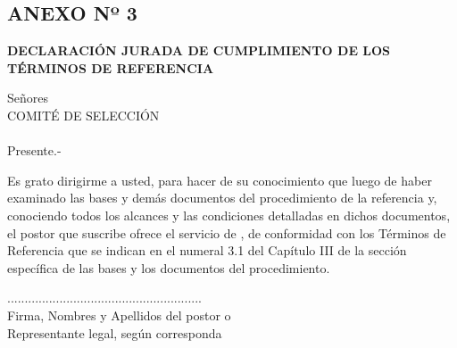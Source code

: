 \begin{center}
    \section*{ANEXO Nº 3} 
    \textbf{DECLARACIÓN JURADA DE CUMPLIMIENTO DE LOS TÉRMINOS DE REFERENCIA}
    \end{center}
    
    Señores \\
    COMITÉ DE SELECCIÓN \\
    \nomenclatura \\
    Presente.-
    
    \vspace{0.5cm}
    
    Es grato dirigirme a usted, para hacer de su conocimiento que luego de haber examinado las bases y demás documentos del procedimiento de la referencia y, conociendo todos los alcances y las condiciones detalladas en dichos documentos, el postor que suscribe ofrece el servicio de \textbf{\objeto}, de conformidad con los Términos de Referencia que se indican en el numeral 3.1 del Capítulo III de la sección específica de las bases y los documentos del procedimiento.
    
    \vspace{0.5cm}
    
    \fecha 
    
    \vspace{2cm}
    
    \begin{center}
    ........................................................\\
    Firma, Nombres y Apellidos del postor o \\ 
    Representante legal, según corresponda
    \end{center}